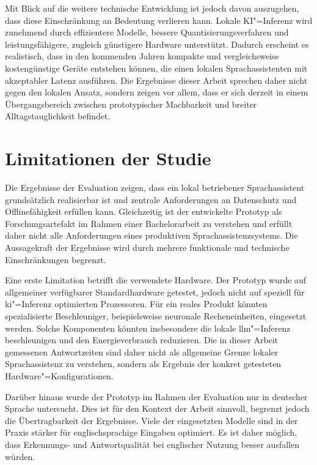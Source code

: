 Mit Blick auf die weitere technische Entwicklung ist jedoch davon auszugehen, dass diese Einschränkung an Bedeutung verlieren kann. Lokale KI"=Inferenz wird zunehmend durch effizientere Modelle, bessere Quantisierungsverfahren und leistungsfähigere, zugleich günstigere Hardware unterstützt. Dadurch erscheint es realistisch, dass in den kommenden Jahren kompakte und vergleichsweise kostengünstige Geräte entstehen können, die einen lokalen Sprachassistenten mit akzeptabler Latenz ausführen. Die Ergebnisse dieser Arbeit sprechen daher nicht gegen den lokalen Ansatz, sondern zeigen vor allem, dass er sich derzeit in einem Übergangsbereich zwischen prototypischer Machbarkeit und breiter Alltagstauglichkeit befindet.


\section{Limitationen der Studie}
\label{sec:Limitationen_der_Studie}
Die Ergebnisse der Evaluation zeigen, dass ein lokal betriebener Sprachassistent grundsätzlich realisierbar ist und zentrale Anforderungen an Datenschutz und Offlinefähigkeit erfüllen kann. Gleichzeitig ist der entwickelte Prototyp als Forschungsartefakt im Rahmen einer Bachelorarbeit zu verstehen und erfüllt daher nicht alle Anforderungen eines produktiven Sprachassistenzsystems. Die Aussagekraft der Ergebnisse wird durch mehrere funktionale und technische Einschränkungen begrenzt.

Eine erste Limitation betrifft die verwendete Hardware. Der Prototyp wurde auf allgemeiner verfügbarer Standardhardware getestet, jedoch nicht auf speziell für \gls{ki}"=Inferenz optimierten Prozessoren. Für ein reales Produkt könnten spezialisierte Beschleuniger, beispielsweise neuronale Recheneinheiten, eingesetzt werden. Solche Komponenten könnten insbesondere die lokale \gls{llm}"=Inferenz beschleunigen und den Energieverbrauch reduzieren. Die in dieser Arbeit gemessenen Antwortzeiten sind daher nicht als allgemeine Grenze lokaler Sprachassistenz zu verstehen, sondern als Ergebnis der konkret getesteten Hardware"=Konfigurationen.

Darüber hinaus wurde der Prototyp im Rahmen der Evaluation nur in deutscher Sprache untersucht. Dies ist für den Kontext der Arbeit sinnvoll, begrenzt jedoch die Übertragbarkeit der Ergebnisse. Viele der eingesetzten Modelle sind in der Praxis stärker für englischsprachige Eingaben optimiert. Es ist daher möglich, dass Erkennungs- und Antwortqualität bei englischer Nutzung besser ausfallen würden.

